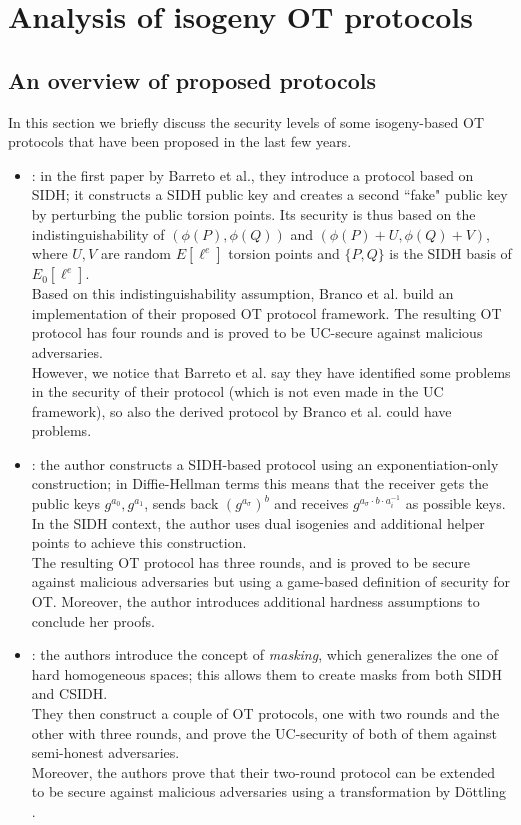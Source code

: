 \chapter{Analysis of isogeny OT protocols}

\section{An overview of proposed protocols}
In this section we briefly discuss the security levels of some isogeny-based OT protocols that have been proposed in the last few years.

\begin{itemize}
    \item \cite{Barreto, Branco}: in the first paper by Barreto et al., they introduce a protocol based on SIDH; it constructs a SIDH public key and creates a second ``fake" public key by perturbing the public torsion points. Its security is thus based on the indistinguishability of $(\phi(P),\phi(Q))$ and $(\phi(P)+U,\phi(Q)+V)$, where $U,V$ are random $E[\ell^e]$ torsion points and $\{P,Q\}$ is the SIDH basis of $E_0[\ell^e]$.\\
    Based on this indistinguishability assumption, Branco et al. build an implementation of their proposed OT protocol framework. The resulting OT protocol has four rounds and is proved to be UC-secure against malicious adversaries.\\
    However, we notice that Barreto et al. say they have identified some problems in the security of their protocol (which is not even made in the UC framework), so also the derived protocol by Branco et al. could have problems.
    
    \item \cite{Vitse}: the author constructs a SIDH-based protocol using an exponentiation-only construction; in Diffie-Hellman terms this means that the receiver gets the public keys $g^{a_0},g^{a_1}$, sends back $\left(g^{a_\sigma}\right)^b$ and receives $g^{a_\sigma\cdot b\cdot a_i^{-1}}$ as possible keys. In the SIDH context, the author uses dual isogenies and additional helper points to achieve this construction.\\
    The resulting OT protocol has three rounds, and is proved to be secure against malicious adversaries but using a game-based definition of security for OT. Moreover, the author introduces additional hardness assumptions to conclude her proofs.
    
    \item \cite{dSG_Orsini}: the authors introduce the concept of \emph{masking}, which generalizes the one of hard homogeneous spaces; this allows them to create masks from both SIDH and CSIDH.\\
    They then construct a couple of OT protocols, one with two rounds and the other with three rounds, and prove the UC-security of both of them against semi-honest adversaries.\\
    Moreover, the authors prove that their two-round protocol can be extended to be secure against malicious adversaries using a transformation by D{\"o}ttling \cite{Dottling}.
    

\end{itemize}
